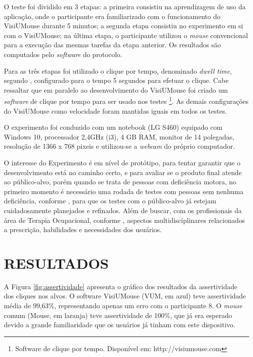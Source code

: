 O teste foi dividido em 3 etapas: a primeira consistiu na aprendizagem de uso da aplicação, onde o participante era familiarizado com o funcionamento do VisiUMouse durante 5 minutos; a segunda etapa consistiu no experimento em si com o VisiUMouse; na última etapa, o participante utilizou o \textit{mouse} convencional para a execução das mesmas tarefas da etapa anterior. Os resultados são computados pelo \textit{software} do protocolo.

Para as três etapas foi utilizado o clique por tempo, denominado \textit{dwell time}, segundo , configurado para o tempo 5 segundos para efetuar o clique. Cabe ressaltar que em paralelo ao desenvolvimento do VisiUMouse foi criado um \textit{software} de clique por tempo para ser usado nos testes \footnote{Software de clique por tempo. Disponível em: http://visiumouse.com}. As demais configurações do VisiUMouse como velocidade foram mantidas iguais em todos os testes.  

O experimento foi conduzido com um notebook (LG S460) equipado com Windows 10, processador 2,4GHz (i3), 4 GB RAM, monitor de 14 polegadas, resolução de 1366 x 768 pixeis e utilizou-se a \textit{webcam} do próprio computador.

O interesse do Experimento é em nível de protótipo, para tentar garantir que o desenvolvimento está no caminho certo, e para avaliar se o produto final atende ao público-alvo, porém quando se trata de pessoas com deficiência motora, no primeiro momento é necessário uma rodada de testes com pessoas sem nenhuma deficiência, conforme \cite{stone2005user}, para que os testes com o público-alvo já estejam cuidadosamente planejados e refinados. Além de buscar, com os profissionais da área de Terapia Ocupacional, conforme \cite{oliveira2015uso}, aspectos multidisciplinares relacionados a prescrição, habilidades e necessidades dos usuários.

\section{RESULTADOS}\label{Sub:resultados-ex-1}
A Figura \ref{fig:assertividade} apresenta o gráfico dos resultados da assertividade dos cliques nos alvos. O software VisiUMouse (VUM, em azul) teve assertividade média de 99,63\%, representando apenas um erro com o participante 8. O \textit{mouse} comum (Mouse, em laranja) teve assertividade de 100\%, que já era esperado devido a grande familiaridade que os usuários já tinham com este dispositivo.

